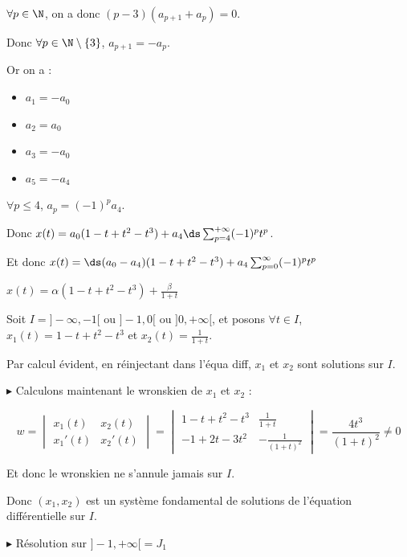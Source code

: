 \begin{exemple}
    $\forall p \in \N$, on a donc $(p - 3)(a_{p + 1} + a_p) = 0$.

    Donc $\forall p \in \N \setminus \{ 3 \}$, $a_{p + 1} = - a_p$. 

    Or on a : 
    \begin{itemize}
        \item $a_1 = -a_0$
        \item $a_2 = a_0$
        \item $a_3 = -a_0$
        \item $a_5 = -a_4$
    \end{itemize}

    $\forall p \leqslant 4$, $a_p = (-1)^p a_4$. 

    Donc $x(t) = a_0 (1 -t + t^2 - t^3) + a_4 \ds \sum_{p = 4}^{+ \infty} (-1)^p t^p$.

    Et donc $x(t) = \ds (a_0 - a_4)(1 - t + t^2 - t^3) + a_4 \sum_{p = 0}^{\infty} (-1)^p t^p$

    $x(t) = \alpha (1 - t + t^2 - t^3) + \frac \beta {1 + t}$

    Soit $I = ] - \infty, -1[$ ou $ ]-1, 0[$ ou $] 0, + \infty[$, et posons 
    $\forall t \in I$, $x_1(t) = 1 - t + t^2 - t^3$ et $x_2(t) = \frac 1 {1 + t}$. 

    Par calcul évident, en réinjectant dans l'équa diff, $x_1$ et $x_2$ sont solutions
    sur $I$.

    \avspace $\blacktriangleright$ Calculons maintenant le wronskien de $x_1$ et $x_2$ :

    $$w = \begin{vmatrix}
        x_1(t) & x_2(t) \\
        x_1'(t) & x_2'(t)
    \end{vmatrix} = \begin{vmatrix}
        1 - t + t^2 - t^3 & \frac 1 {1 + t} \\
        -1 + 2t - 3t^2 & -\frac 1 {(1 + t)^2}
    \end{vmatrix} = \frac {4t^3} {(1 + t)^2} \neq 0$$

    Et donc le wronskien ne s'annule jamais sur $I$. 

    Donc $(x_1, x_2)$ est un système fondamental de solutions de l'équation différentielle sur $I$.

    \lvspace \avspace {}

    \lvspace $\blacktriangleright$ Résolution sur $]-1, +\infty[ = J_1$


\end{exemple}
